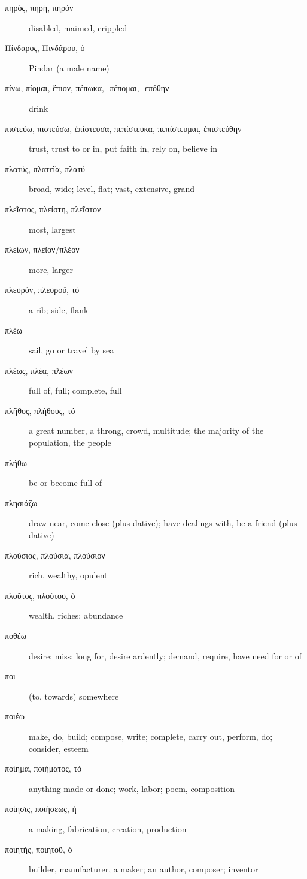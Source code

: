 \documentclass[12pt,letterpaper]{article}
\begin{document}
\begin{description}
    \item[\textgreek{πηρός, πηρή, πηρόν}] disabled, maimed, crippled
    \item[\textgreek{Πίνδαρος, Πινδάρου, ὁ}] Pindar (a male name)
    \item[\textgreek{πίνω, πίομαι, ἔπιον, πέπωκα, -πέπομαι, -επόθην}] \marginnote{*}drink
    \item[\textgreek{πιστεύω, πιστεύσω, ἐπίστευσα, πεπίστευκα, πεπίστευμαι, ἐπιστεύθην}] \marginnote{*}trust, trust to or in, put faith in, rely on, believe in
    \item[\textgreek{πλατύς, πλατεῖα, πλατύ}] broad, wide; level, flat; vast, extensive, grand
    \item[\textgreek{πλεῖστος, πλείστη, πλεῖστον}] \marginnote{*}most, largest
    \item[\textgreek{πλείων, πλεῖον/πλέον}] \marginnote{*}more, larger
    \item[\textgreek{πλευρόν, πλευροῦ, τό}] a rib; side, flank
    \item[\textgreek{πλέω}] sail, go or travel by sea
    \item[\textgreek{πλέως, πλέα, πλέων}] full of, full; complete, full
    \item[\textgreek{πλῆθος, πλήθους, τό}] \marginnote{*}a great number, a throng, crowd, multitude; the majority of the population, the people
    \item[\textgreek{πλήθω}] be or become full of
    \item[\textgreek{πλησιάζω}] draw near, come close (plus dative); have dealings with, be a friend (plus dative)
    \item[\textgreek{πλούσιος, πλούσια, πλούσιον}] rich, wealthy, opulent
    \item[\textgreek{πλοῦτος, πλούτου, ὁ}] wealth, riches; abundance
    \item[\textgreek{ποθέω}] desire; miss; long for, desire ardently; demand, require, have need for or of
    \item[\textgreek{ποι}] (to, towards) somewhere
    \item[\textgreek{ποιέω}] make, do, build; compose, write; complete, carry out, perform, do; consider, esteem
    \item[\textgreek{ποίημα, ποιήματος, τό}] anything made or done; work, labor; poem, composition
    \item[\textgreek{ποίησις, ποιήσεως, ἡ}] a making, fabrication, creation, production
    \item[\textgreek{ποιητής, ποιητοῦ, ὁ}] builder, manufacturer, a maker; an author, composer; inventor

\end{description}
\end{document}
